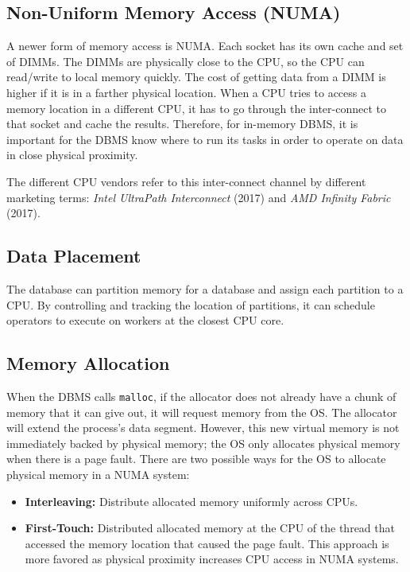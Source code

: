 \documentclass[11pt]{article}
\begin{document}
\subsection*{Non-Uniform Memory Access (NUMA)}
A newer form of memory access is NUMA. Each socket has its own cache and set of DIMMs. The DIMMs are 
physically close to the CPU, so the CPU can read/write to local memory quickly. The cost of getting 
data from a DIMM is higher if it is in a farther physical location. When a CPU tries to access a 
memory location in a different CPU, it has to go through the inter-connect to that socket and cache 
the results. Therefore, for in-memory DBMS, it is important for the DBMS know where to run its tasks 
in order to operate on data in close physical proximity.

The different CPU vendors refer to this inter-connect channel by different marketing terms: 
\textit{Intel UltraPath Interconnect} (2017) and \textit{AMD Infinity Fabric} (2017).

\subsection*{Data Placement}
The database can partition memory for a database and assign each partition to a CPU. By controlling 
and tracking the location of partitions, it can schedule operators to execute on workers at the 
closest CPU core.

\subsection*{Memory Allocation}
When the DBMS calls \texttt{malloc}, if the allocator does not already have a chunk of memory that 
it can give out, it will request memory from the OS. The allocator will extend the process's data 
segment. However, this new virtual memory is not immediately backed by physical memory; the OS only 
allocates physical memory when there is a page fault. There are two possible ways for the OS to 
allocate physical memory in a NUMA system:

\begin{itemize}
    \item \textbf{Interleaving:}
    Distribute allocated memory uniformly across CPUs.
  
    \item \textbf{First-Touch:}
    Distributed allocated memory at the CPU of the thread that accessed 
    the memory location that caused the page fault. This approach is more favored as physical 
    proximity increases CPU access in NUMA systems.
\end{itemize}
\end{document}
